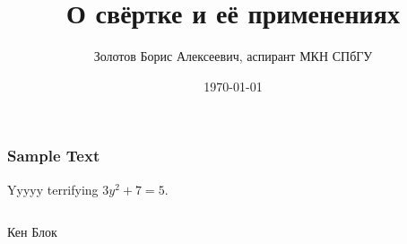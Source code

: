 \documentclass[11pt,aspectratio=169,svgnames]{beamer}
\title{О свёртке и её применениях}
\date{\today}
\author{Золотов Борис Алексеевич, аспирант МКН СПбГУ}
\institute{«Лига Лекторов», 3 сезон}
\newenvironment{nblock}[1]{
	\begin{center} \begin{columns}[t] \begin{column}{110mm} \begin{block}{#1}
   }{
	\end{block} \end{column} \end{columns} \end{center}
}
\begin{document}
 \maketitle

\begin{frame} \frametitle{Sample Text}
	Yyyyy terrifying \(3y^2+7=5\).

\begin{nblock}{\vspace*{-3ex}}
Кен Блок \end{nblock}
\end{frame}
\end{document}
